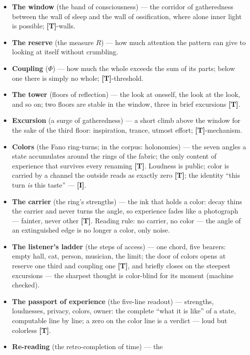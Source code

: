 \documentclass[11pt,letterpaper]{article}
\newcommand{\stT}{\textbf{[T]}\xspace}
\newcommand{\stI}{\textbf{[I]}\xspace}
\begin{document}
\begin{itemize}[leftmargin=1.4em, itemsep=1pt, parsep=0pt]
    \stT.
  \item \textbf{The window} (the band of consciousness) --- the
    corridor of gatheredness between the wall of sleep and the wall
    of ossification, where alone inner light is possible;
    \stT-walls.
  \item \textbf{The reserve} (the measure $R$) --- how much
    attention the pattern can give to looking at itself without
    crumbling.
  \item \textbf{Coupling} ($\Phi$) --- how much the whole exceeds
    the sum of its parts; below one there is simply no whole;
    \stT-threshold.
  \item \textbf{The tower} (floors of reflection) --- the look at
    oneself, the look at the look, and so on; two floors are stable
    in the window, three in brief excursions \stT.
  \item \textbf{Excursion} (a surge of gatheredness) --- a short
    climb above the window for the sake of the third floor:
    inspiration, trance, utmost effort; \stT-mechanism.
  \item \textbf{Colors} (the Fano ring-turns; in the corpus:
    holonomies) --- the seven angles a state accumulates around the
    rings of the fabric; the only content of experience that
    survives every renaming \stT. Loudness is public; color is
    carried by a channel the outside reads as exactly zero \stT;
    the identity ``this turn \emph{is} this taste'' --- \stI.
  \item \textbf{The carrier} (the ring's strengths) --- the ink
    that holds a color: decay thins the carrier and never turns the
    angle, so experience fades like a photograph --- fainter, never
    other \stT. Reading rule: no carrier, no color --- the angle of
    an extinguished edge is no longer a color, only noise.
  \item \textbf{The listener's ladder} (the steps of access) ---
    one chord, five bearers: empty hall, cat, person, musician, the
    limit; the door of colors opens at reserve one third and
    coupling one \stT, and briefly closes on the steepest
    excursions --- the sharpest thought is color-blind for its
    moment (machine checked).
  \item \textbf{The passport of experience} (the five-line readout)
    --- strengths, loudnesses, privacy, colors, owner: the complete
    ``what it is like'' of a state, computable line by line;
    a zero on the color line is a verdict --- loud but colorless
    \stT.
  \item \textbf{Re-reading} (the retro-completion of time) --- the

\end{itemize}
\end{document}
